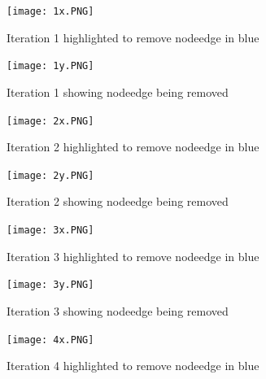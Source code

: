 \documentclass[12pt]{article}
\begin{document}
\begin{figure}[h]
    \centering
    \texttt{[image: 1x.PNG]}
    \caption{Iteration 1 highlighted to remove nodeedge in blue}
    \label{fig:web-growth}
\end{figure}

\begin{figure}[h]
    \centering
    \texttt{[image: 1y.PNG]}
    \caption{Iteration 1 showing nodeedge being removed}
    \label{fig:web-growth}
\end{figure}

\begin{figure}[h]
    \centering
    \texttt{[image: 2x.PNG]}
    \caption{Iteration 2 highlighted to remove nodeedge in blue}
    \label{fig:web-growth}
\end{figure}

\begin{figure}[h]
    \centering
    \texttt{[image: 2y.PNG]}
    \caption{Iteration 2 showing nodeedge being removed}
    \label{fig:web-growth}
\end{figure}


\begin{figure}[h]
    \centering
    \texttt{[image: 3x.PNG]}
    \caption{Iteration 3 highlighted to remove nodeedge in blue}
    \label{fig:web-growth}
\end{figure}

\begin{figure}[h]
    \centering
    \texttt{[image: 3y.PNG]}
    \caption{Iteration 3 showing nodeedge being removed}
    \label{fig:web-growth}
\end{figure}

\begin{figure}[h]
    \centering
    \texttt{[image: 4x.PNG]}
    \caption{Iteration 4 highlighted to remove nodeedge in blue}
    \label{fig:web-growth}
\end{figure}
\end{document}
